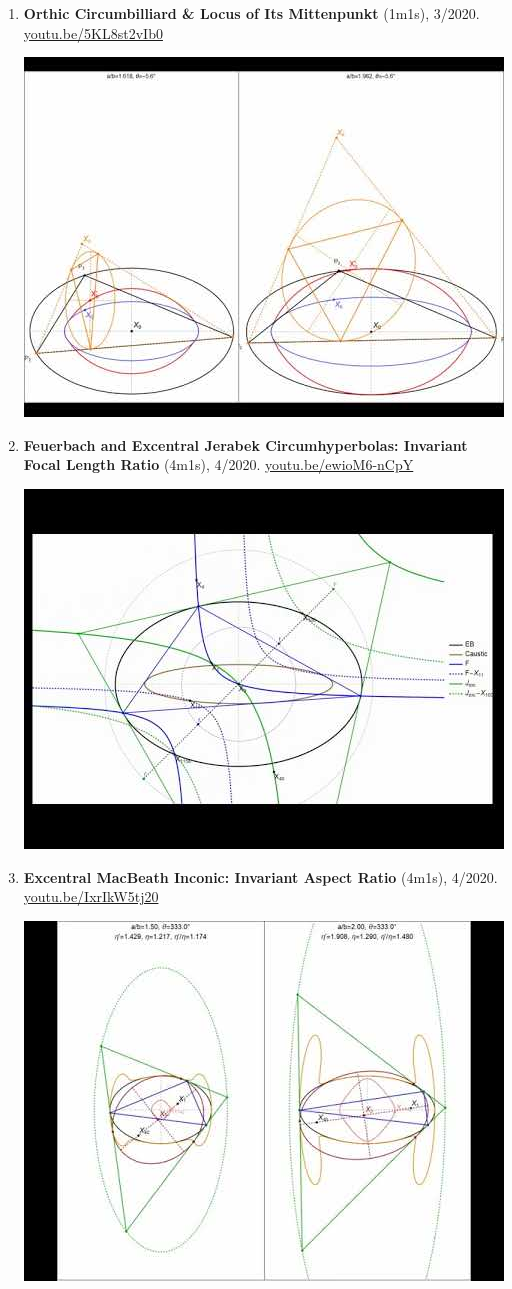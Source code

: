 \documentclass[12pt]{article}
\begin{document}
\begin{enumerate}[resume]
% 
\item \textbf{Orthic Circumbilliard \& Locus of Its Mittenpunkt} (1m1s), 3/2020. \href{https://youtu.be/5KL8st2vIb0}{\url{youtu.be/5KL8st2vIb0}}
\begin{center}\includegraphics[width=.5\textwidth]{pics/5KL8st2vIb0.jpg}\end{center}
% 
\item \textbf{Feuerbach and Excentral Jerabek Circumhyperbolas: Invariant Focal Length Ratio} (4m1s), 4/2020. \href{https://youtu.be/ewioM6-nCpY}{\url{youtu.be/ewioM6-nCpY}}
\begin{center}\includegraphics[width=.5\textwidth]{pics/ewioM6-nCpY.jpg}\end{center}
% 
\item \textbf{Excentral MacBeath Inconic: Invariant Aspect Ratio} (4m1s), 4/2020. \href{https://youtu.be/IxrIkW5tj20}{\url{youtu.be/IxrIkW5tj20}}
\begin{center}\includegraphics[width=.5\textwidth]{pics/IxrIkW5tj20.jpg}\end{center}

\end{enumerate}
\end{document}
